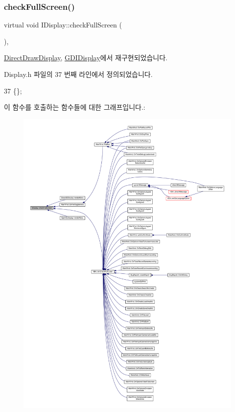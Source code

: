 \subsubsection{\texorpdfstring{check\+Full\+Screen()}{checkFullScreen()}}
{\footnotesize\ttfamily virtual void I\+Display\+::check\+Full\+Screen (\begin{DoxyParamCaption}{ }\end{DoxyParamCaption})\hspace{0.3cm}{\ttfamily [inline]}, {\ttfamily [virtual]}}



\mbox{\hyperlink{class_direct_draw_display_ada4eacae559651471181ec781dce1716}{Direct\+Draw\+Display}}, \mbox{\hyperlink{class_g_d_i_display_a515bce84bcfc615fe0bb983f2ce3e20b}{G\+D\+I\+Display}}에서 재구현되었습니다.



Display.\+h 파일의 37 번째 라인에서 정의되었습니다.


\begin{DoxyCode}
37 \{\};
\end{DoxyCode}
이 함수를 호출하는 함수들에 대한 그래프입니다.\+:
\nopagebreak
\begin{figure}[H]
\begin{center}
\leavevmode
\includegraphics[width=350pt]{class_i_display_afcb9df4a4949d13491f9a07a2ce24eb0_icgraph}
\end{center}
\end{figure}
\mbox{\label{class_i_display_a039e8c6b3f8fbee485fb895ef70e72c0}} 
